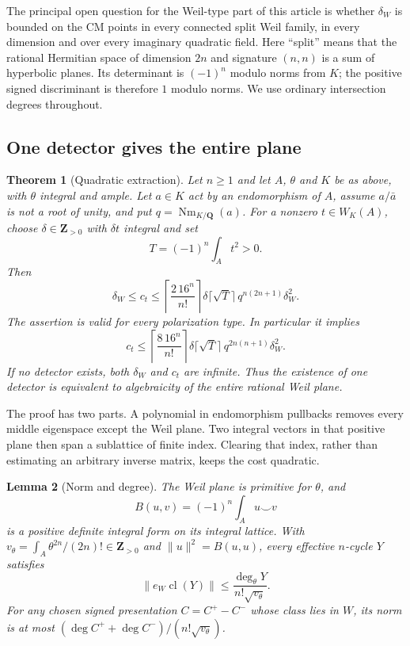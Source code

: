 \documentclass[11pt]{article}
\newtheorem{theorem}{Theorem}[section]
\newtheorem{lemma}[theorem]{Lemma}
\theoremstyle{definition}
\theoremstyle{remark}
\newcommand{\Q}{\mathbf Q}
\newcommand{\Z}{\mathbf Z}
\newcommand{\cl}{\operatorname{cl}}
\newcommand{\Nm}{\operatorname{Nm}}
\begin{document}
The principal open question for the Weil-type part of this article is whether $\delta_W$ is bounded on the CM points in every connected split Weil family, in every dimension and over every imaginary quadratic field. Here ``split'' means that the rational Hermitian space of dimension $2n$ and signature $(n,n)$ is a sum of hyperbolic planes. Its determinant is $(-1)^n$ modulo norms from $K$; the positive signed discriminant is therefore $1$ modulo norms. We use ordinary intersection degrees throughout.

\subsection{One detector gives the entire plane}

\begin{theorem}[Quadratic extraction]\label{thm:extraction}
Let $n\geq1$ and let $A$, $\theta$ and $K$ be as above, with $\theta$ integral and ample. Let $a\in K$ act by an endomorphism of $A$, assume $a/\bar a$ is not a root of unity, and put $q=\Nm_{K/\Q}(a)$. For a nonzero $t\in W_K(A)$, choose $\delta\in\Z_{>0}$ with $\delta t$ integral and set
\[
 T=(-1)^n\int_A t^2>0.
\]
Then
\begin{equation}\label{eq:sharper-extraction}
 \delta_W\leq c_t\leq
 \left\lceil\frac{2\,16^n}{n!}\right\rceil
 \delta\lceil\sqrt T\rceil\,
 q^{n(2n+1)}\delta_W^2.
\end{equation}
The assertion is valid for every polarization type. In particular it implies
\begin{equation}\label{eq:original-extraction}
 c_t\leq
 \left\lceil\frac{8\,16^n}{n!}\right\rceil
 \delta\lceil\sqrt T\rceil\,
 q^{2n(n+1)}\delta_W^2.
\end{equation}
If no detector exists, both $\delta_W$ and $c_t$ are infinite. Thus the existence of one detector is equivalent to algebraicity of the entire rational Weil plane.
\end{theorem}

The proof has two parts. A polynomial in endomorphism pullbacks removes every middle eigenspace except the Weil plane. Two integral vectors in that positive plane then span a sublattice of finite index. Clearing that index, rather than estimating an arbitrary inverse matrix, keeps the cost quadratic.

\begin{lemma}[Norm and degree]\label{lem:weil-norm}
The Weil plane is primitive for $\theta$, and
\[
 B(u,v)=(-1)^n\int_Au\smile v
\]
is a positive definite integral form on its integral lattice. With
$v_\theta=\int_A\theta^{2n}/(2n)!\in\Z_{>0}$ and
$\|u\|^2=B(u,u)$, every effective $n$-cycle $Y$ satisfies
\[
 \|e_W\cl(Y)\|\leq\frac{\deg_\theta Y}{n!\sqrt{v_\theta}}.
\]
For any chosen signed presentation $C=C^+-C^-$ whose class lies in $W$, its norm is at most
$(\deg C^++\deg C^-)/(n!\sqrt{v_\theta})$.
\end{lemma}
\end{document}
